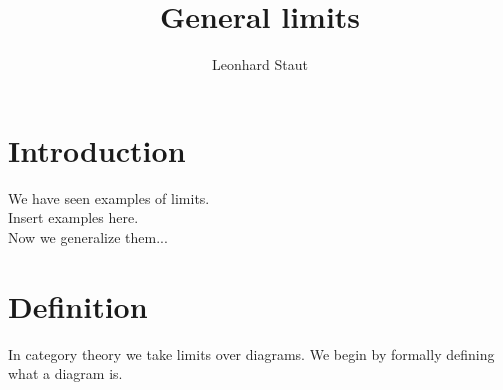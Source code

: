 \def\pathToRoot{../../}

\title{General limits}
\author{Leonhard Staut}



\maketitle
\chapter{Introduction}
We have seen examples of limits.\\
Insert examples here.\\
Now we generalize them...
\chapter{Definition}

In category theory we take limits over diagrams.
We begin by formally defining what a diagram is.

